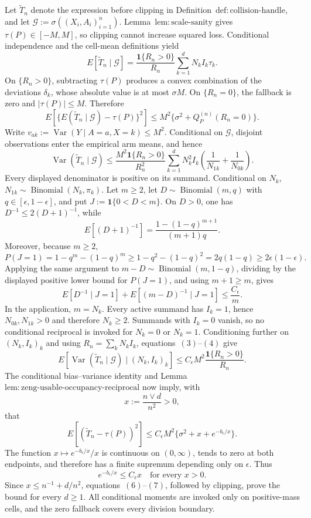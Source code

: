 Let \(\widetilde T_n\) denote the expression before clipping in Definition~\(\mathrm{def:collision\text{-}handle}\), and let \(\mathcal G:=\sigma((X_i,A_i)_{i=1}^n)\).  Lemma~\(\mathrm{lem:scale\text{-}sanity}\) gives \(\tau(P)\in[-M,M]\), so clipping cannot increase squared loss.  Conditional independence and the cell-mean definitions yield
\[
 E[\widetilde T_n\mid\mathcal G]
 =\frac{\mathbf 1\{R_n>0\}}{R_n}\sum_{k=1}^dN_kI_k\tau_k.
\tag{1}
\]
On \(\{R_n>0\}\), subtracting \(\tau(P)\) produces a convex combination of the deviations \(\delta_k\), whose absolute value is at most \(\sigma M\).  On \(\{R_n=0\}\), the fallback is zero and \(|\tau(P)|\le M\).  Therefore
\[
 E\!\left[\{E(\widetilde T_n\mid\mathcal G)-\tau(P)\}^2\right]
 \le M^2\{\sigma^2+Q_P^{(n)}(R_n=0)\}.
\tag{2}
\]
Write \(v_{ak}:=\operatorname{Var}(Y\mid A=a,X=k)\le M^2\).  Conditional on \(\mathcal G\), disjoint observations enter the empirical arm means, and hence
\[
 \operatorname{Var}(\widetilde T_n\mid\mathcal G)
 \le \frac{M^2\mathbf 1\{R_n>0\}}{R_n^2}
 \sum_{k=1}^dN_k^2I_k\left(\frac1{N_{1k}}+\frac1{N_{0k}}\right).
\tag{3}
\]
Every displayed denominator is positive on its summand.  Conditional on \(N_k\), \(N_{1k}\sim\operatorname{Binomial}(N_k,\pi_k)\).  Let \(m\ge2\), let \(D\sim\operatorname{Binomial}(m,q)\) with \(q\in[\epsilon,1-\epsilon]\), and put \(J:=\mathbf1\{0<D<m\}\).  On \(D>0\), one has \(D^{-1}\le2(D+1)^{-1}\), while
\[
 E[(D+1)^{-1}]=\frac{1-(1-q)^{m+1}}{(m+1)q}.
\]
Moreover, because \(m\ge2\),
\[
 P(J=1)=1-q^m-(1-q)^m
 \ge 1-q^2-(1-q)^2
 =2q(1-q)
 \ge2\epsilon(1-\epsilon).
\]
Applying the same argument to \(m-D\sim\operatorname{Binomial}(m,1-q)\), dividing by the displayed positive lower bound for \(P(J=1)\), and using \(m+1\ge m\), gives
\[
 E[D^{-1}\mid J=1]+E[(m-D)^{-1}\mid J=1]
 \le \frac{C_{\epsilon}}m.
\tag{4}
\]
In the application, \(m=N_k\).  Every active summand has \(I_k=1\), hence \(N_{0k},N_{1k}>0\) and therefore \(N_k\ge2\).  Summands with \(I_k=0\) vanish, so no conditional reciprocal is invoked for \(N_k=0\) or \(N_k=1\).  Conditioning further on \((N_k,I_k)_k\) and using \(R_n=\sum_kN_kI_k\), equations~\((3)\)--\((4)\) give
\[
 E[\operatorname{Var}(\widetilde T_n\mid\mathcal G)\mid(N_k,I_k)_k]
 \le C_{\epsilon}M^2\frac{\mathbf1\{R_n>0\}}{R_n}.
\tag{5}
\]
The conditional bias--variance identity and Lemma~\(\mathrm{lem:zeng\text{-}usable\text{-}occupancy\text{-}reciprocal}\) now imply, with
\[
 x:=\frac{n\vee d}{n^2}>0,
\]
that
\[
 E[(\widetilde T_n-\tau(P))^2]
 \le C_{\epsilon}M^2\{\sigma^2+x+e^{-b_{\epsilon}/x}\}.
\tag{6}
\]
The function \(x\mapsto e^{-b_{\epsilon}/x}/x\) is continuous on \((0,\infty)\), tends to zero at both endpoints, and therefore has a finite supremum depending only on \(\epsilon\).  Thus
\[
 e^{-b_{\epsilon}/x}\le C_{\epsilon}x
 \quad\text{for every }x>0.
\tag{7}
\]
Since \(x\le n^{-1}+d/n^2\), equations~\((6)\)--\((7)\), followed by clipping, prove the bound for every \(d\ge1\).  All conditional moments are invoked only on positive-mass cells, and the zero fallback covers every division boundary.